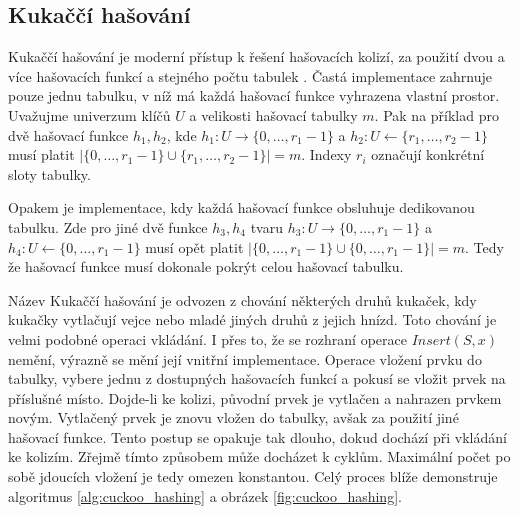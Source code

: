 \subsection{Kukaččí hašování}
Kukaččí hašování je moderní přístup k řešení hašovacích kolizí, za použití dvou a více hašovacích
funkcí a stejného počtu tabulek \cite{Cuckoo_hashing}. Častá implementace zahrnuje pouze jednu
tabulku, v níž má každá hašovací funkce vyhrazena vlastní prostor. Uvažujme univerzum klíčů $U$
a velikosti hašovací tabulky $m$. Pak na příklad pro dvě hašovací funkce 
$h_1, h_2$, kde $h_1 : U \rightarrow \{0,\ldots,r_1-1\}$ a $h_2 : U \leftarrow \{r_1,\ldots,r_2-1\}$ musí platit
$|\{0,\ldots,r_1-1\} \cup \{r_1,\ldots,r_2-1\}| = m$. Indexy $r_i$ označují konkrétní sloty tabulky.

Opakem je implementace, kdy každá hašovací funkce obsluhuje dedikovanou tabulku. Zde pro
jiné dvě funkce $h_3, h_4$ tvaru $h_3 : U \rightarrow \{0,\ldots,r_1-1\}$ a $h_4 : U \leftarrow \{0,\ldots,r_1-1\}$
musí opět platit $|\{0,\ldots,r_1-1\} \cup \{0,\ldots,r_1-1\}| = m$. Tedy že hašovací funkce musí dokonale pokrýt
celou hašovací tabulku.

Název Kukaččí hašování je odvozen z chování některých druhů kukaček, kdy kukačky vytlačují vejce nebo mladé jiných druhů
z jejich hnízd. Toto chování je velmi podobné operaci vkládání. I přes to, že se rozhraní operace $Insert(S,x)$ nemění,
výrazně se mění její vnitřní implementace. Operace vložení prvku do tabulky, vybere jednu z dostupných hašovacích
funkcí a pokusí se vložit prvek na příslušné místo. Dojde-li ke kolizi, původní prvek je vytlačen a nahrazen prvkem novým.
Vytlačený prvek je znovu vložen do tabulky, avšak za použití jiné hašovací funkce. Tento postup se opakuje tak dlouho, dokud
dochází při vkládání ke kolizím. Zřejmě tímto způsobem může docházet k cyklům. Maximální počet po sobě jdoucích vložení je tedy
omezen konstantou. Celý proces blíže demonstruje algoritmus \ref{alg:cuckoo_hashing} a obrázek \ref{fig:cuckoo_hashing}.

